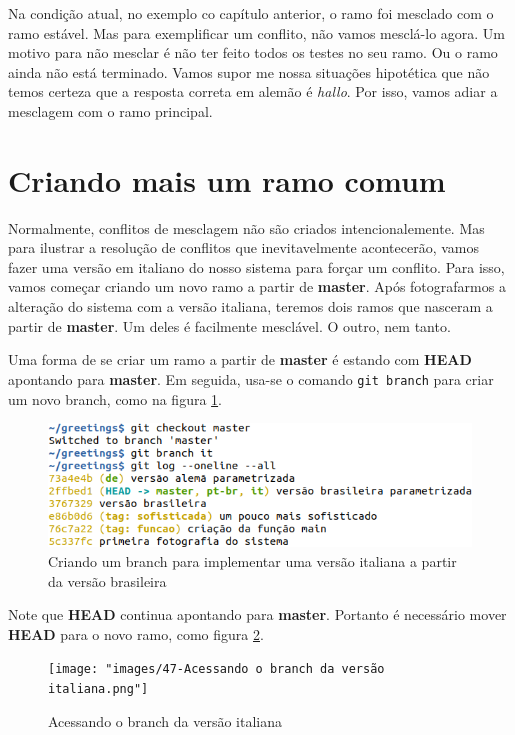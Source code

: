 \documentclass[a4paper]{book}
\begin{document}
Na condição atual, no exemplo co capítulo anterior,
o ramo foi mesclado com o ramo estável.
Mas para exemplificar um conflito, não vamos mesclá-lo 
agora.
Um motivo para não mesclar é não ter feito todos os
testes no seu ramo.
Ou o ramo ainda não está terminado.
Vamos supor me nossa situações hipotética que 
não temos certeza que a resposta correta em alemão
é \textit{hallo}.
Por isso, vamos adiar a mesclagem com o ramo principal.

\newpage
\section{Criando mais um ramo comum}

Normalmente, conflitos de mesclagem não são criados 
intencionalemente. Mas para ilustrar a resolução 
de conflitos que inevitavelmente acontecerão,
vamos fazer uma versão em italiano do nosso 
sistema para forçar um conflito.
Para isso, vamos começar criando um novo ramo a
partir de \textbf{master}.
Após fotografarmos a alteração do sistema
com a versão italiana, teremos dois ramos que
nasceram a partir de \textbf{master}.
Um deles é facilmente mesclável. O outro, nem tanto.

Uma forma de se criar um ramo a partir de \textbf{master}
é estando com \textbf{HEAD} apontando para \textbf{master}.
Em seguida, usa-se o comando \texttt{git branch} para 
criar um novo branch, como na figura \ref{fig:46}.

\begin{figure}[ht]
\caption{Criando um branch para implementar uma versão italiana a partir da versão brasileira}
\label{fig:46}
\centering
\includegraphics[scale=0.6]{"images/46-Criando um branch para implementar uma versão italiana a partir da versão brasileira.png"}
\end{figure}

Note que \textbf{HEAD} continua apontando para
\textbf{master}.
Portanto é necessário mover \textbf{HEAD} para o novo
ramo, como figura \ref{fig:47}.

\begin{figure}[ht]
\caption{Acessando o branch da versão italiana}
\label{fig:47}
\centering
\texttt{[image: "images/47-Acessando o branch da versão italiana.png"]}
\end{figure}
\end{document}
